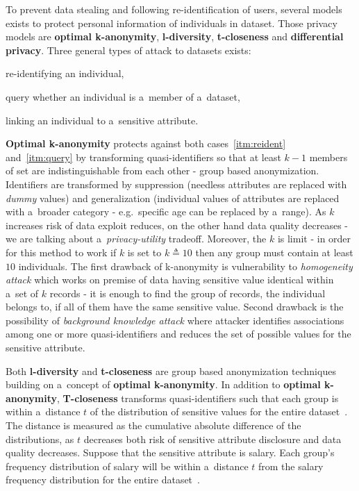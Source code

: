 To prevent data stealing and following re-identification of users, several models exists to protect personal information of individuals in dataset.
Those privacy models are \textbf{optimal k-anonymity}, \textbf{l-diversity}, \textbf{t-closeness} and \textbf{differential privacy}.
Three general types of attack to datasets exists:
\begin{enumerate*}[label=(\roman*)]
    \item \label{itm:reident} re-identifying an individual,
    \item \label{itm:query} query whether an individual is a~member of a~dataset,
    \item \label{itm:linking} linking an individual to a~sensitive attribute.
\end{enumerate*}

\textbf{Optimal k-anonymity} protects against both cases~\ref{itm:reident} and~\ref{itm:query} by transforming quasi-identifiers so that at least \( k - 1 \) members of set are indistinguishable from each other - group based anonymization.
Identifiers are transformed by suppression (needless attributes are replaced with \textit{dummy} values) and generalization (individual values of attributes are replaced with a~broader category - e.g.\ specific age can be replaced by a~range).
As \( k \) increases risk of data exploit reduces, on the other hand data quality decreases - we are talking about a~\textit{privacy-utility} tradeoff.
Moreover, the \( k \) is limit - in order for this method to work if \( k \) is set to \( k \triangleq 10 \) then any group must contain at least \( 10 \) individuals.
The first drawback of k-anonymity is vulnerability to \textit{homogeneity attack} which works on premise of data having sensitive value identical within a~set of \( k \) records - it is enough to find the group of records, the individual belongs to, if all of them have the same sensitive value.
Second drawback is the possibility of \textit{background knowledge attack} where attacker identifies associations among one or more quasi-identifiers and reduces the set of possible values for the sensitive attribute.

Both \textbf{l-diversity} and \textbf{t-closeness} are group based anonymization techniques building on a~concept of \textbf{optimal k-anonymity}.
In addition to \textbf{optimal k-anonymity}, \textbf{T-closeness} transforms quasi-identifiers such that each group is within a~distance \( t \) of the distribution of sensitive values for the entire dataset~\cite{web:privacy-models}.
The distance is measured as the cumulative absolute difference of the distributions, as \( t \) decreases both risk of sensitive attribute disclosure and data quality decreases.
Suppose that the sensitive attribute is salary.
Each group's frequency distribution of salary will be within a~distance \( t \) from the salary frequency distribution for the entire dataset~\cite{web:privacy-models}.

